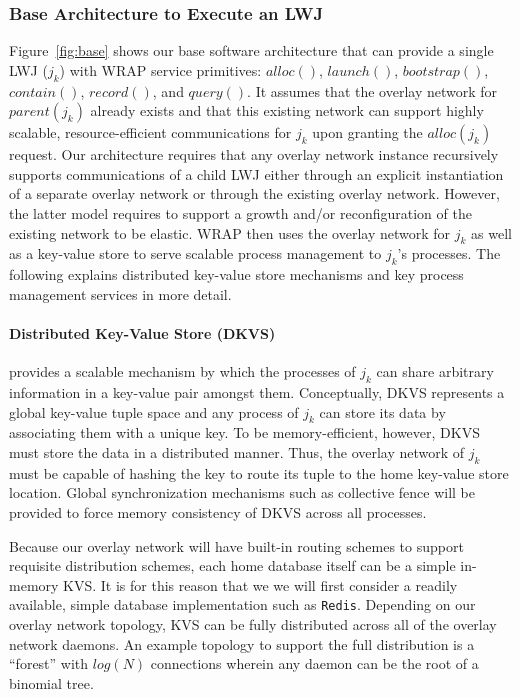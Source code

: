 \subsubsection{Base Architecture to Execute an LWJ}
Figure~\ref{fig:base} shows our base software architecture
that can provide a single LWJ ($j_k$) with WRAP service primitives:
$alloc()$,
$launch()$,
$bootstrap()$,
$contain()$,
$record()$, and
$query()$.
It assumes that the overlay network for $parent(j_k)$
already exists and that this existing network can support highly scalable,
resource-efficient communications for $j_k$ upon granting the $alloc(j_k)$ request. 
Our architecture requires that any overlay network instance recursively
supports communications of a child LWJ either
through an explicit instantiation of a separate overlay network
or through the existing overlay network. However, the latter model
requires to support a growth and/or reconfiguration
of the existing network to be elastic.
WRAP then uses the overlay network for $j_k$ as well as
a key-value store to serve scalable process management
to $j_k$'s processes.
The following explains distributed key-value store mechanisms 
and key process management services in more detail.

\paragraph{Distributed Key-Value Store (DKVS)}
\label{sect:dkvs}
provides a scalable mechanism 
by which the processes of $j_k$ can
share arbitrary information in a key-value pair amongst them.
Conceptually, DKVS represents a global key-value tuple space
and any process of $j_k$ can store its data by associating them
with a unique key. To be memory-efficient,
however, DKVS must store the data in a distributed
manner. Thus, the overlay network of $j_k$ must be capable of hashing the key
to route its tuple to the home key-value store location. Global synchronization
mechanisms such as collective fence will be provided to force
memory consistency of DKVS across all processes.

Because our overlay network will have built-in routing
schemes to support requisite distribution schemes,
each home database itself can be a simple in-memory KVS.
It is for this reason that we we will first consider a readily available, simple
database implementation such as {\tt Redis}. 
Depending on our overlay network topology,
KVS can be fully distributed across all of the overlay network daemons.
An example topology to support the full distribution is a ``forest''
with $log(N)$ connections wherein any daemon can be
the root of a binomial tree.


